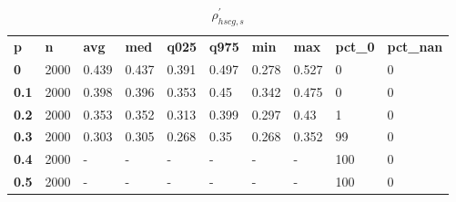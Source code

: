 \begin{table}[h]
 \centering 
\footnotesize
\caption{$\rho_{hscg,s}^\prime $}
\label{tab:alphahscgs}
\begin{tabular}[h]{| l l l l l l l l l l|
    } \hline
\textbf{ p} & \textbf{ n} & \textbf{ avg} & \textbf{ med} & \textbf{ q025} & \textbf{ q975} & \textbf{ min} & \textbf{ max} & \textbf{ pct\_0} & \textbf{ pct\_nan}
           \\
  \textbf{  0} & 2000 & 0.439 & 0.437 & 0.391 & 0.497 & 0.278 & 0.527 &   0 & 0
           \\
  \textbf{0.1} & 2000 & 0.398 & 0.396 & 0.353 &  0.45 & 0.342 & 0.475 &   0 & 0
           \\
  \textbf{0.2} & 2000 & 0.353 & 0.352 & 0.313 & 0.399 & 0.297 &  0.43 &   1 & 0
           \\
  \textbf{0.3} & 2000 & 0.303 & 0.305 & 0.268 &  0.35 & 0.268 & 0.352 &  99 & 0
           \\
  \textbf{0.4} & 2000 & - & - & - & - & - & - & 100 & 0
           \\
  \textbf{0.5} & 2000 & - & - & - & - & - & - & 100 & 0
           \\
 \hline \end{tabular}
 \end{table}
